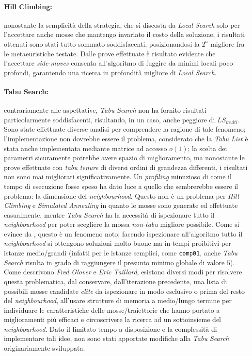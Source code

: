 \documentclass[]{article}
\begin{document}
\paragraph{Hill Climbing:} nonostante la semplicità della strategia, che si discosta da \textit{Local Search} solo per l'accettare anche mosse che mantengo invariato il costo della soluzione, i risultati ottenuti sono stati tutto sommato soddisfacenti, posizionandosi la $2^a$ migliore fra le metaeuristiche testate. Dalle prove effettuate è risultato evidente che l'accettare \textit{side-moves} consenta all'algoritmo di fuggire da minimi locali poco profondi, garantendo una ricerca in profondità migliore di \textit{Local Search}.

\paragraph{Tabu Search:} contrariamente alle aspettative, \textit{Tabu Search} non ha fornito risultati particolarmente soddisfacenti, risultando, in un caso, anche peggiore di $LS_{multi}$. Sono state effettuate diverse analisi per comprendere la ragione di tale fenomeno; l'implementazione non dovrebbe essere il problema, considerato che la \textit{Tabu List} è stata anche implementata mediante  matrice ad accesso $o(1)$; la scelta dei parametri sicuramente potrebbe avere spazio di miglioramento, ma nonostante le prove effettuate con \textit{tabu tenure} di diversi ordini di grandezza differenti, i risultati non sono mai migliorati significativamente. Un \textit{profiling} minuzioso di come il tempo di esecuzione fosse speso ha dato luce a quello che sembrerebbe essere il problema: la dimensione del \textit{neighbourhood}. Questo non è un problema per \textit{Hill Climbing} e \textit{Simulated Annealing} in quanto le mosse sono generate ed effettuate casualmente, mentre \textit{Tabu Search} ha la necessità di ispezionare tutto il \textit{neighbourhood} per poter scegliere la mossa \textit{non-tabu} migliore possibile. Come si evince da \cite{bib:tabu-search-guide}, questo è un fenomeno noto; facendo ispezionare all'algoritmo tutto il \textit{neighbourhood} si ottengono soluzioni molto buone ma in tempi proibitivi per istanze medio/grandi (infatti per le istanze semplici, come \texttt{comp01}, anche \textit{Tabu Search} risulta in grado di raggiungere il presunto minimo globale di valore $5$). Come descrivono \textit{Fred Glover} e \textit{Eric Taillard}, esistono diversi modi per risolvere questa problematica, dal conservare, dall'iterazione precedente, una lista di possibili mosse candidate \textit{elite} da ispezionare in modo esclusivo o prima del resto del \textit{neighbourhood}, all'usare strutture di memoria a medio/lungo termine per individuare le caratteristiche delle mosse/traiettorie che hanno portato a miglioramenti più efficaci e circoscrivere la ricerca ad un sottoinsieme del \textit{neighbourhood}. Dato il limitato tempo a disposizione e la complessità di implementare tali idee, non sono stati apportate modifiche alla \textit{Tabu Search} originariamente sviluppata.

\printbibliography
\end{document}
